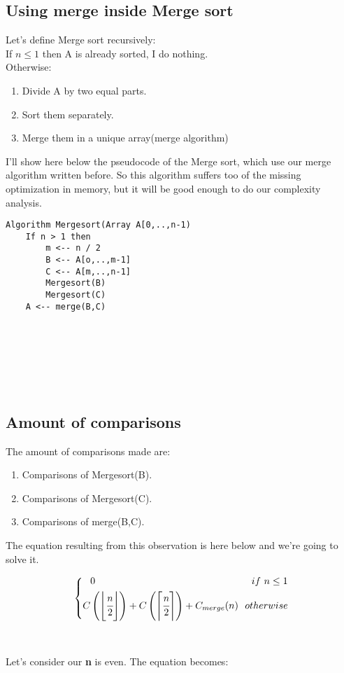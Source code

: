 \documentclass{article}
\DeclarePairedDelimiter\ceil{\lceil}{\rceil}
\DeclarePairedDelimiter\floor{\lfloor}{\rfloor}
\begin{document}
\subsection{Using merge inside Merge sort}
Let's define Merge sort recursively:\\
If $n \leq 1$ then A is already sorted, I do nothing.\\
Otherwise:\\
\begin{enumerate}
\item Divide A by two equal parts.
\item Sort them separately.
\item Merge them in a unique array(merge algorithm)
\end{enumerate}

I'll show here below the pseudocode of the Merge sort, which use our merge algorithm written before. So this algorithm suffers too of the missing optimization in memory, but it will be good enough to do our complexity analysis.

\begin{lstlisting}[caption={\\\textit{Merge algorithm.}}]
Algorithm Mergesort(Array A[0,..,n-1)
	If n > 1 then
		m <-- n / 2
		B <-- A[o,..,m-1]
		C <-- A[m,..,n-1]
		Mergesort(B)
		Mergesort(C)
	A <-- merge(B,C)
\end{lstlisting}
\leavevmode \\ \\ \\ \\ \\

\subsection{Amount of comparisons}

The amount of comparisons made are:\\
\begin{enumerate}
\item Comparisons of Mergesort(B).
\item Comparisons of Mergesort(C).
\item Comparisons of merge(B,C).
\end{enumerate}

The equation resulting from this observation is here below and we're going to solve it.

\begin{equation*}
	\left\{ \begin{aligned}
	0 \ \ \ \ \ \ \ \ \ \ \ \ \ \ \ \ \ \ \ \ \ \ \ \ \ \ \ \ \ \ \ \ \ \ \ \ \ \ \ \ \ \ \ \ \ \ \ \ if \ n \leq 1 \\
	C\left(\floor*{\cfrac{n}{2}}\right) + 	C\left(\ceil*{\cfrac{n}{2}}\right) + C_{merge}(n) \ \ otherwise
	\end{aligned} \right.
\end{equation*}
\leavevmode \\ \\
Let's consider our \textbf{n} is even. The equation becomes:\\
\end{document}
